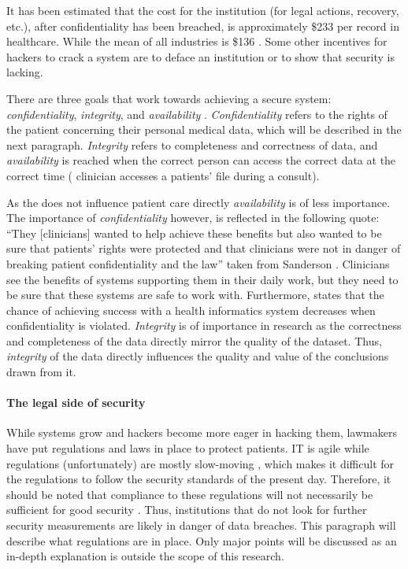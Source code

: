 It has been estimated that the cost for the institution (for legal actions, recovery, etc.), after confidentiality has been breached, is approximately \$233 per record in healthcare.
While the mean of all industries is \$136 \cite{s2Perakslis2014}.
Some other incentives for hackers to crack a system are to deface an institution or to show that security is lacking.

There are three goals that work towards achieving a secure system: \emph{confidentiality}, \emph{integrity}, and \emph{availability} \cite{s8FernandezAleman2013}.
\emph{Confidentiality} refers to the rights of the patient concerning their personal medical data, which will be described in the next paragraph.
\emph{Integrity} refers to completeness and correctness of data, and \emph{availability} is reached when the correct person can access the correct data at the correct time (\eg{} clinician accesses a patients' file during a consult).

As the \ivfsystem{} does not influence patient care directly \emph{availability} is of less importance.
The importance of \emph{confidentiality} however, is reflected in the following quote: ``They [clinicians] wanted to help achieve these benefits but also wanted to be sure that patients' rights were protected and that clinicians were not in danger of breaking patient confidentiality and the law'' taken from Sanderson \cite{s5Sanderson2004}.
Clinicians see the benefits of systems supporting them in their daily work, but they need to be sure that these systems are safe to work with.
Furthermore, \cite{s4Layman2008} states that the chance of achieving success with a health informatics system decreases when confidentiality is violated.
\emph{Integrity} is of importance in research as the correctness and completeness of the data directly mirror the quality of the dataset.
Thus, \emph{integrity} of the data directly influences the quality and value of the conclusions drawn from it.

\paragraph{The legal side of security}
\label{security-legal}

While systems grow and hackers become more eager in hacking them, lawmakers have put regulations and laws in place to protect patients.
IT is agile while regulations (unfortunately) are mostly slow-moving \cite{s20Groves2013}, which makes it difficult for the regulations to follow the security standards of the present day.
Therefore, it should be noted that compliance to these regulations will not necessarily be sufficient for good security \cite{s20Groves2013}.
Thus, institutions that do not look for further security measurements are likely in danger of data breaches.
This paragraph will describe what regulations are in place. 
Only major points will be discussed as an in-depth explanation is outside the scope of this research.

